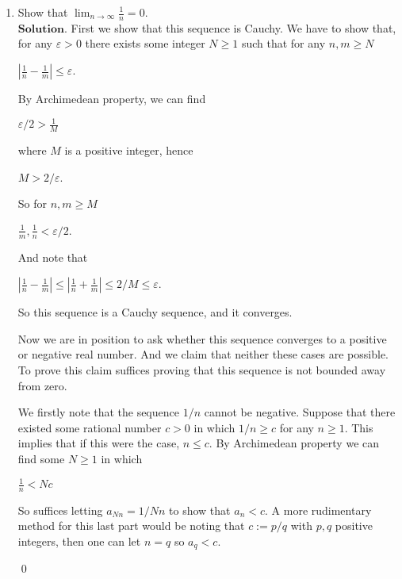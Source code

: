 \documentclass{article}
\newcommand{\abs}[1]{\left|#1\right|}
\theoremstyle{remark}
\begin{document}
\begin{enumerate}
        \item Show that \( \lim_{n \to \infty} \frac{1}{n} = 0 \).\\
        $\textbf{Solution.}$
        First we show that this sequence is Cauchy.
        We have to show that, for any $\varepsilon > 0$ there exists some integer $N \geq 1$ such that for any $n,m \geq N$
        \begin{center}
            $\displaystyle \abs{\frac{1}{n} - \frac{1}{m}} \leq \varepsilon$.
        \end{center}
        By Archimedean property, we can find
        \begin{center}
            $\displaystyle \varepsilon/2 > \frac{1}{M}$
        \end{center}
        where $M$ is a positive integer, hence 
        \begin{center}
            $\displaystyle M > 2/\varepsilon$.
        \end{center}
        So for $n,m \geq M$
        \begin{center}
            $\displaystyle \frac{1}{m}, \frac{1}{n} < \varepsilon/2$.
        \end{center}
        And note that
        \begin{center}
            $\displaystyle \abs{\frac{1}{n} - \frac{1}{m}} \leq \abs{\frac{1}{n} + \frac{1}{m}} \leq 2/M \leq \varepsilon$.
        \end{center}
        So this sequence is a Cauchy sequence, and it converges.
        
        Now we are in position to ask whether this sequence converges to a positive or negative real number. 
        And we claim that neither these cases are possible.
        To prove this claim suffices proving that this sequence is not bounded away from zero.

        We firstly note that the sequence $1/n$ cannot be negative.
        Suppose that there existed some rational number $c>0$ in which $1/n \geq c$ for any $n \geq 1$.
        This implies that if this were the case, $n \leq c$.
        By Archimedean property we can find some $N \geq 1$ in which 
        \begin{center}
            $\displaystyle \frac{1}{n} < Nc$ 
        \end{center}
        So suffices letting $a_{Nn} = 1/{Nn}$ to show that $a_n < c$.
        A more rudimentary method for this last part would be noting that $c := p/q$ with $p,q$ positive integers,
        then one can let $n = q$ so $a_q < c$.
        \begin{flushright}
            \qed
        \end{flushright}


\end{enumerate}
\end{document}
